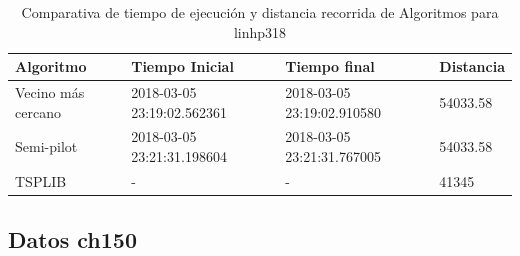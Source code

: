 \documentclass{article}
\begin{document}
\begin{table}[H]
\centering
\caption{Comparativa de tiempo de ejecución y distancia recorrida de Algoritmos para linhp318}
\label{Table:linhp318}
\begin{tabular}{| l | l | l | l |}
	\hline
	Algoritmo & Tiempo Inicial & Tiempo final & Distancia \\ \hline
	Vecino más cercano & 2018-03-05 23:19:02.562361 & 2018-03-05 23:19:02.910580 & 54033.58 \\ \hline
	Semi-pilot & 2018-03-05 23:21:31.198604 & 2018-03-05 23:21:31.767005 & 54033.58 \\ \hline
	TSPLIB & - & - & 41345 \\ \hline
	
\end{tabular}
\end{table}

\subsection{Datos ch150}
\end{document}
